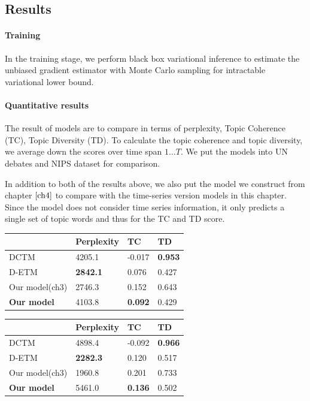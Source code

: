 \subsection{Results}
\paragraph{Training}
In the training stage, we perform black box variational inference to estimate the unbiased gradient estimator with Monte Carlo sampling for intractable variational lower bound.
\paragraph{Quantitative results}
The result of models are to compare in terms of perplexity, Topic Coherence (TC), Topic Diversity (TD). To calculate the topic coherence and topic diversity, we average down the scores over time span $ 1\dots T $. We put the models into UN debates and NIPS dataset for comparison.

In addition to both of the results above, we also put the model we construct from chapter $ \ref{ch4} $ to compare with the time-series version models in this chapter. Since the model does not consider time series information, it only predicts a single set of topic words and thus for the TC and TD score.
\begin{table}[h]
\centering
\begin{tabular}{llll}
\hline
     & Perplexity  &TC&TD\\ \hline
DCTM	     	&  4205.1 & -0.017 & \textbf{0.953}\\
D-ETM	     	&  \textbf{2842.1} & 0.076 & 0.427 \\
Our model(ch3) & 2746.3 & 0.152 & 0.643 \\
\textbf{Our model}  & 4103.8 & \textbf{0.092} & 0.429 \\ \hline
\end{tabular}
\end{table}
\begin{table}[h]
\centering
\begin{tabular}{llll}
\hline
     & Perplexity & TC & TD \\\hline
DCTM	     	& 4898.4 & -0.092 & \textbf{0.966} \\
D-ETM	     	& \textbf{2282.3} & 0.120 & 0.517 \\
Our model(ch3) & 1960.8 & 0.201 & 0.733 \\
\textbf{Our model}  & 5461.0 & \textbf{0.136} & 0.502 \\\hline
\end{tabular}
\end{table}

